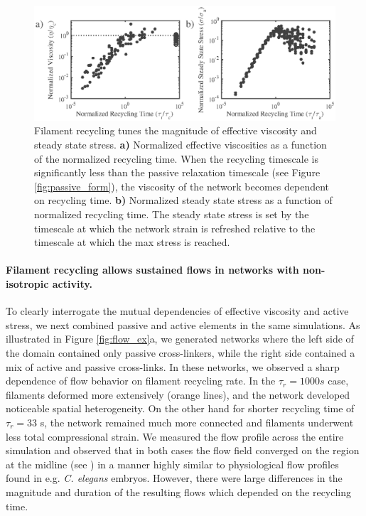 \documentclass[10pt,letterpaper]{article}
\begin{document}
\begin{figure}[h!]
\centering
\includegraphics[width=\hsize]{figures/figure5S}
\caption{\label{fig:rec_form}  Filament recycling tunes the magnitude of effective viscosity and steady state stress. \textbf{a)}  Normalized effective viscosities as a function of the normalized recycling time. When the recycling timescale is significantly less than the passive relaxation timescale (see Figure \ref{fig:passive_form}), the viscosity of the network becomes dependent on recycling time.  \textbf{b)} Normalized steady state stress as a function of normalized recycling time.  The steady state stress is set by the timescale at which the network strain is refreshed relative to the timescale at which the max stress is reached. }
\end{figure}


\paragraph{Filament recycling allows sustained flows in networks with non-isotropic activity.}
To clearly interrogate the mutual dependencies of effective viscosity and active stress, we next combined passive and active elements in the same simulations.  As illustrated in Figure \ref{fig:flow_ex}a, we generated networks where the left side of the domain contained only passive cross-linkers, while the right side contained a mix of active and passive cross-links.  In these networks, we observed a sharp dependence of flow behavior on filament recycling rate.  In the $\tau_r=1000 s$ case, filaments deformed more extensively (orange lines), and the network developed noticeable spatial heterogeneity.  On the other hand for shorter recycling time of $\tau_r=33$ s, the network remained much more connected and filaments underwent less total compressional strain.  We measured the flow profile across the entire simulation and observed that in both cases the flow field converged on the region at the midline (see ) in a manner highly similar to physiological flow profiles found in e.g. \textit{C. elegans} embryos.  However, there were large differences in the magnitude and duration of the resulting flows which depended on the recycling time.
\end{document}
